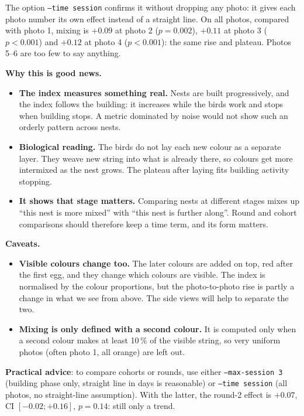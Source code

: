 \documentclass[11pt,a4paper]{article}
\newcommand{\code}[1]{\texttt{#1}}
\begin{document}
The option \code{--time session} confirms it without dropping any photo: it gives each photo number its own effect instead of a straight line.
On all photos, compared with photo 1, mixing is $+0.09$ at photo 2 ($p = 0.002$), $+0.11$ at photo 3 ($p < 0.001$)
and $+0.12$ at photo 4 ($p < 0.001$): the same rise and plateau. Photos 5--6 are too few to say anything.

\textbf{Why this is good news.}
\begin{itemize}
\item \textbf{The index measures something real.} Nests are built progressively, and the index follows the building:
      it increases while the birds work and stops when building stops.
      A metric dominated by noise would not show such an orderly pattern across nests.
\item \textbf{Biological reading.} The birds do not lay each new colour as a separate layer.
      They weave new string into what is already there, so colours get more intermixed as the nest grows.
      The plateau after laying fits building activity stopping.
\item \textbf{It shows that stage matters.} Comparing nests at different stages mixes up ``this nest is more mixed'' with
      ``this nest is further along''. Round and cohort comparisons should therefore keep a time term, and its form matters.
\end{itemize}

\textbf{Caveats.}
\begin{itemize}
\item \textbf{Visible colours change too.} The later colours are added on top, red after the first egg,
      and they change which colours are visible. The index is normalised by the colour proportions, but the photo-to-photo
      rise is partly a change in what we see from above. The side views will help to separate the two.
\item \textbf{Mixing is only defined with a second colour.} It is computed only when a second colour makes at least 10\,\% of the visible string,
      so very uniform photos (often photo 1, all orange) are left out.
\end{itemize}

\textbf{Practical advice}: to compare cohorts or rounds, use either \code{--max-session 3}
(building phase only, straight line in days is reasonable) or \code{--time session} (all photos, no straight-line assumption).
With the latter, the round-2 effect is $+0.07$, CI $[-0.02; +0.16]$, $p = 0.14$: still only a trend.
\end{document}
